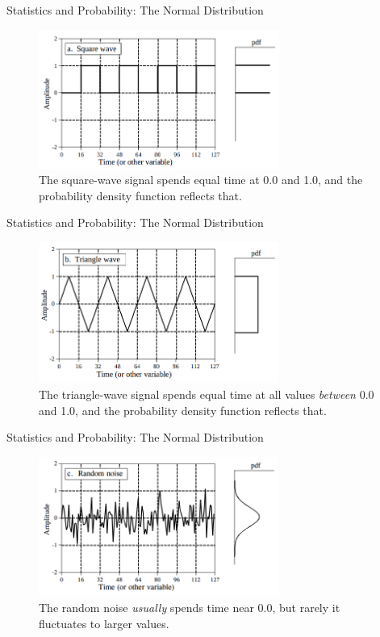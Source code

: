 \documentclass{beamer}
\begin{document}
\begin{frame}[fragile]{Statistics and Probability: The Normal Distribution}
\begin{figure}
\centering
\includegraphics[width=0.7\textwidth]{figures/squarepdf.png}
\caption{\label{fig:squarepdf} The square-wave signal spends equal time at 0.0 and 1.0, and the probability density function reflects that.}
\end{figure}
\end{frame}

\begin{frame}[fragile]{Statistics and Probability: The Normal Distribution}
\begin{figure}
\centering
\includegraphics[width=0.7\textwidth]{figures/trianglepdf.png}
\caption{\label{fig:trianglepdf} The triangle-wave signal spends equal time at all values \textit{between} 0.0 and 1.0, and the probability density function reflects that.}
\end{figure}
\end{frame}

\begin{frame}[fragile]{Statistics and Probability: The Normal Distribution}
\begin{figure}
\centering
\includegraphics[width=0.7\textwidth]{figures/randnpdf.png}
\caption{\label{fig:randnpdf} The random noise \textit{usually} spends time near 0.0, but rarely it fluctuates to larger values.}
\end{figure}
\end{frame}
\end{document}
